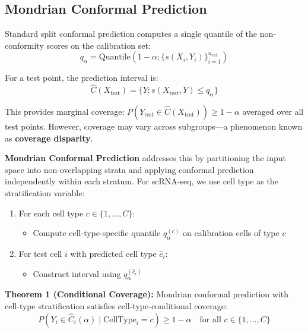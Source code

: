 \documentclass{article}
\begin{document}
\subsection{Mondrian Conformal Prediction}

Standard split conformal prediction computes a single quantile of the non-conformity scores on the calibration set:
\begin{equation}
    q_\alpha = \text{Quantile}(1-\alpha; \{s(X_i, Y_i)\}_{i=1}^{n_{\text{cal}}})
\end{equation}

For a test point, the prediction interval is:
\begin{equation}
    \hat{C}(X_{\text{test}}) = \{Y : s(X_{\text{test}}, Y) \leq q_\alpha\}
\end{equation}

This provides marginal coverage: $P(Y_{\text{test}} \in \hat{C}(X_{\text{test}})) \geq 1-\alpha$ averaged over all test points. However, coverage may vary across subgroups---a phenomenon known as \textbf{coverage disparity}.

\textbf{Mondrian Conformal Prediction} addresses this by partitioning the input space into non-overlapping strata and applying conformal prediction independently within each stratum. For scRNA-seq, we use cell type as the stratification variable:

\begin{enumerate}
    \item For each cell type $c \in \{1, \ldots, C\}$:
    \begin{itemize}
        \item Compute cell-type-specific quantile $q_\alpha^{(c)}$ on calibration cells of type $c$
    \end{itemize}
    \item For test cell $i$ with predicted cell type $\hat{c}_i$:
    \begin{itemize}
        \item Construct interval using $q_\alpha^{(\hat{c}_i)}$
    \end{itemize}
\end{enumerate}

\textbf{Theorem 1 (Conditional Coverage):} Mondrian conformal prediction with cell-type stratification satisfies cell-type-conditional coverage:
\begin{equation}
    P(Y_i \in \hat{C}_i(\alpha) \mid \text{CellType}_i = c) \geq 1 - \alpha \quad \text{for all } c \in \{1, \ldots, C\}
\end{equation}
\end{document}
